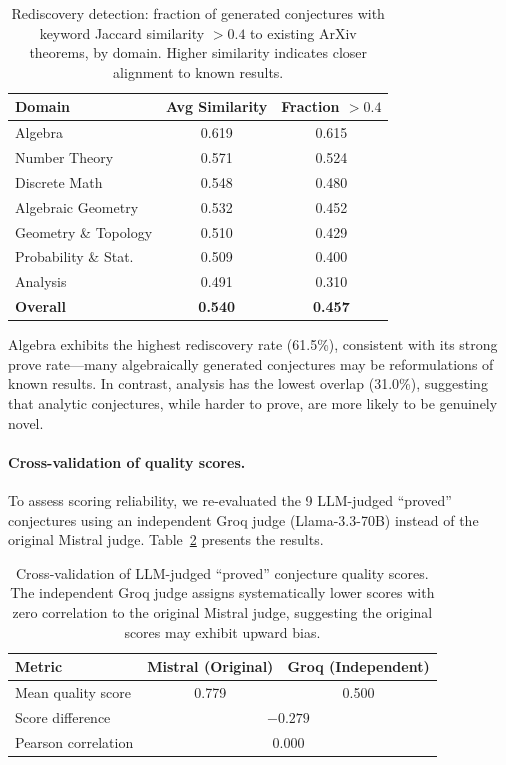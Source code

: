 \documentclass[11pt,a4paper]{article}
\begin{document}
\begin{table}[h]
\centering
\caption{Rediscovery detection: fraction of generated conjectures with keyword Jaccard similarity $> 0.4$ to existing ArXiv theorems, by domain. Higher similarity indicates closer alignment to known results.}
\label{tab:rediscovery}
\small
\begin{tabular}{@{}lcc@{}}
\toprule
\textbf{Domain} & \textbf{Avg Similarity} & \textbf{Fraction $> 0.4$} \\
\midrule
Algebra             & 0.619 & 0.615 \\
Number Theory       & 0.571 & 0.524 \\
Discrete Math       & 0.548 & 0.480 \\
Algebraic Geometry  & 0.532 & 0.452 \\
Geometry \& Topology & 0.510 & 0.429 \\
Probability \& Stat. & 0.509 & 0.400 \\
Analysis            & 0.491 & 0.310 \\
\midrule
\textbf{Overall}    & \textbf{0.540} & \textbf{0.457} \\
\bottomrule
\end{tabular}
\end{table}

Algebra exhibits the highest rediscovery rate (61.5\%), consistent with its strong prove rate---many algebraically generated conjectures may be reformulations of known results. In contrast, analysis has the lowest overlap (31.0\%), suggesting that analytic conjectures, while harder to prove, are more likely to be genuinely novel.

\paragraph{Cross-validation of quality scores.}
To assess scoring reliability, we re-evaluated the 9 LLM-judged ``proved'' conjectures using an independent Groq judge (Llama-3.3-70B) instead of the original Mistral judge. Table~\ref{tab:cross_validation} presents the results.

\begin{table}[h]
\centering
\caption{Cross-validation of LLM-judged ``proved'' conjecture quality scores. The independent Groq judge assigns systematically lower scores with zero correlation to the original Mistral judge, suggesting the original scores may exhibit upward bias.}
\label{tab:cross_validation}
\small
\begin{tabular}{@{}lcc@{}}
\toprule
\textbf{Metric} & \textbf{Mistral (Original)} & \textbf{Groq (Independent)} \\
\midrule
Mean quality score   & 0.779 & 0.500 \\
Score difference     & \multicolumn{2}{c}{$-0.279$} \\
Pearson correlation  & \multicolumn{2}{c}{$0.000$} \\
\bottomrule
\end{tabular}
\end{table}
\end{document}
